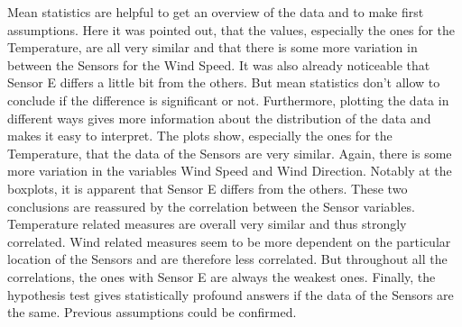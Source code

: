 \documentclass{article}
\begin{document}
Mean statistics are helpful to get an overview of the data and to make first assumptions. Here it was pointed out, that the values, especially the ones for the Temperature, are all very similar and that there is some more variation in between the Sensors for the Wind Speed. It was also already noticeable that Sensor E differs a little bit from the others. But mean statistics don’t allow to conclude if the difference is significant or not. Furthermore, plotting the data in different ways gives more information about the distribution of the data and makes it easy to interpret. The plots show, especially the ones for the Temperature, that the data of the Sensors are very similar. Again, there is some more variation in the variables Wind Speed and Wind Direction. Notably at the boxplots, it is apparent that Sensor E differs from the others. These two conclusions are reassured by the correlation between the Sensor variables. Temperature related measures are overall very similar and thus strongly correlated. Wind related measures seem to be more dependent on the particular location of the Sensors and are therefore less correlated. But throughout all the correlations, the ones with Sensor E are always the weakest ones. Finally, the hypothesis test gives statistically profound answers if the data of the Sensors are the same. Previous assumptions could be confirmed.




\end{document}
